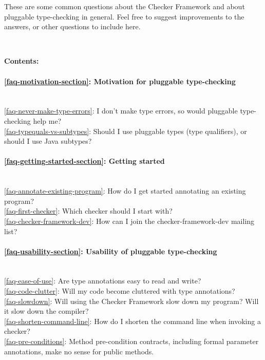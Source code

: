 \htmlhr
{}

These are some common questions about the Checker Framework and about
pluggable type-checking in general.  Feel free to suggest improvements to
the answers, or other questions to include here.


~

\newcommand{\faqtocpara}[1]{\paragraph{#1} ~}


\noindent
\textbf{Contents:}

\faqtocpara{\ref{faq-motivation-section}: Motivation for pluggable type-checking}
\\ \ref{faq-never-make-type-errors}: I don't make type errors, so would pluggable type-checking help me?
\\ \ref{faq-typequals-vs-subtypes}: Should I use pluggable types (type qualifiers), or should I use Java subtypes?

\faqtocpara{\ref{faq-getting-started-section}: Getting started}
\\ \ref{faq-annotate-existing-program}: How do I get started annotating an existing program?
\\ \ref{faq-first-checker}: Which checker should I start with?
\\ \ref{faq-checker-framework-dev}: How can I join the checker-framework-dev mailing list?

\faqtocpara{\ref{faq-usability-section}: Usability of pluggable type-checking}
\\ \ref{faq-ease-of-use}: Are type annotations easy to read and write?
\\ \ref{faq-code-clutter}: Will my code become cluttered with type annotations?
\\ \ref{faq-slowdown}: Will using the Checker Framework slow down my program?  Will it slow down the compiler?
\\ \ref{faq-shorten-command-line}: How do I shorten the command line when invoking a checker?
\\ \ref{faq-pre-conditions}: Method pre-condition contracts, including formal parameter annotations, make no sense for public methods.


